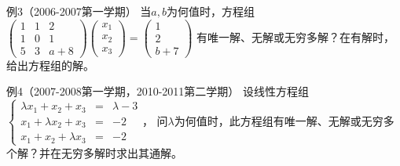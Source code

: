 \begin{frame}\ft{\subsecname}
  \begin{scriptsize}
    \begin{exampleblock}{例3（2006-2007第一学期）}
      当$a,b$为何值时，方程组
      $
      \left(
      \begin{array}{ccc}
        1&1&2\\
        1&0&1\\
        5&3&a+8
      \end{array}
      \right)\left(
      \begin{array}{c}
        x_1\\x_2\\x_3
      \end{array}
      \right)=\left(
      \begin{array}{c}
        1\\2\\b+7
      \end{array}
      \right)
      $
      有唯一解、无解或无穷多解？在有解时，给出方程组的解。
    \end{exampleblock}
    
    \begin{exampleblock}{例4（2007-2008第一学期，2010-2011第二学期）}
      设线性方程组$\left\{
      \begin{array}{rcl}
        \lambda x_1+x_2+x_3&=&\lambda-3\\
        x_1+\lambda x_2+x_3&=&-2\\
        x_1+x_2+\lambda x_3&=&-2
      \end{array}
      \right.$，
      问$\lambda$为何值时，此方程组有唯一解、无解或无穷多个解？并在无穷多解时求出其通解。
    \end{exampleblock}
  \end{scriptsize}
\end{frame}



